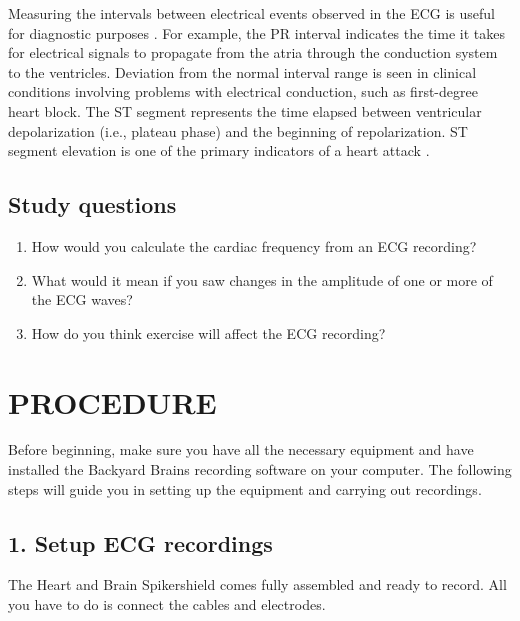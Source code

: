 \documentclass[12pt]{article}
\begin{document}
Measuring the intervals between electrical events observed in the ECG is useful for diagnostic purposes \citep{CVphys,mohrman2006cardiovascular,openStaxElectrical}. For example, the PR interval indicates the time it takes for electrical signals to propagate from the atria through the conduction system to the ventricles. Deviation from the normal interval range is seen in clinical conditions involving problems with electrical conduction, such as first-degree heart block. The ST segment represents the time elapsed between ventricular depolarization (i.e., plateau phase) and the beginning of repolarization. ST segment elevation is one of the primary indicators of a heart attack \citep{CVphys,mohrman2006cardiovascular,openStaxElectrical}. 

\subsection*{Study questions}

\begin{enumerate}
    \item How would you calculate the cardiac frequency from an ECG recording?
    \item What would it mean if you saw changes in the amplitude of one or more of the ECG waves?
    \item How do you think exercise will affect the ECG recording? 
\end{enumerate}

\section*{PROCEDURE}
Before beginning, make sure you have all the necessary equipment and have installed the Backyard
Brains recording software on your computer. The following steps will guide you in setting up the equipment and carrying out recordings.

\subsection*{1. Setup ECG recordings}

The Heart and Brain Spikershield comes fully assembled and ready to record. All you have to do is connect the cables and electrodes. 
\end{document}
